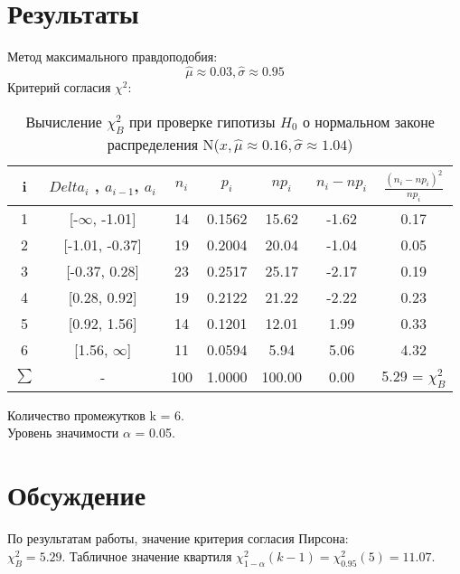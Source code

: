 \documentclass[a4]{article}
\begin{document}
	\section{Результаты}
	Метод максимального правдоподобия:\\
	$$\hat{\mu} \approx 0.03, \hat{\sigma} \approx 0.95$$
	Критерий согласия $\chi^2$:
	\begin{table}[h!]
		
		\caption{Вычисление $\chi^2_B$ при проверке гипотизы $H_0$ о нормальном законе распределения N($x, \hat{\mu} \approx 0.16, \hat{\sigma} \approx 1.04$)}
		\label{tab:my_label}
		\begin{center}
			\vspace{5mm}
			
			\begin{tabular}{|c|c|c|c|c|c|c|}
				\hline
				i & $Delta_i$ , $a_{i - 1}$, $a_i$          &   $n_i$ &   $p_i$ &   $np_i$ &   $n_i-np_i$ &   $\frac{(n_i-np_i)^2}{np_i}$ \\
				\hline
				1 & [-$\infty$, -1.01] & 14 &  0.1562 &    15.62 &        -1.62 &        0.17 \\
				\hline
				2 & [-1.01, -0.37]     & 19 &  0.2004 &    20.04 &        -1.04 &            0.05 \\
				\hline
				3 & [-0.37, 0.28]      &  23 &  0.2517 &    25.17 &        -2.17 &               0.19 \\
				\hline
				4 & [0.28, 0.92]       &   19 &  0.2122 &    21.22 &        -2.22 &           0.23 \\
				\hline
				5 & [0.92, 1.56]       &  14 &  0.1201 &    12.01 &         1.99 &        0.33    \\
				\hline
				6 & [1.56, $\infty$]   & 11 &  0.0594 &     5.94 &         5.06 &         4.32 \\
				\hline
				$\sum$ & -                  &     100 &  1.0000      &   100.00    &         0.00  &                         5.29 = $\chi^2_B$\\
				\hline
			\end{tabular}
		\end{center}
	\end{table}

	Количество промежутков k = 6.\\
	Уровень значимости $\alpha$ = 0.05.\\
	
	\section{Обсуждение}
		По результатам работы, значение критерия согласия Пирсона:\\
		$\chi^2_B = 5.29$. Табличное значение квартиля $\chi^2_{1 - \alpha}(k - 1) = \chi^2_{0.95}(5) = 11.07$.\\
		
\end{document}
